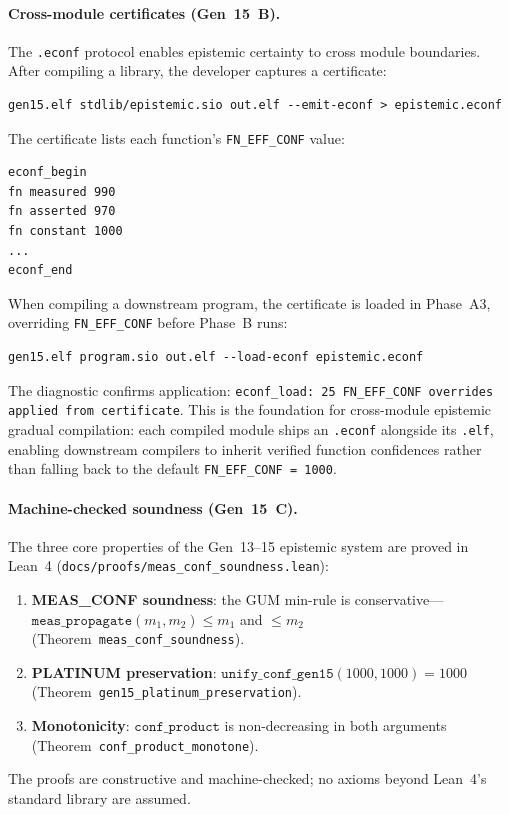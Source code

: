 \documentclass[acmsmall,screen,review,anonymous]{acmart}
\begin{document}
\paragraph{Cross-module certificates (Gen~15~B).}
The \texttt{.econf} protocol enables epistemic certainty to cross module
boundaries.
After compiling a library, the developer captures a certificate:
\begin{verbatim}
gen15.elf stdlib/epistemic.sio out.elf --emit-econf > epistemic.econf
\end{verbatim}
The certificate lists each function's \texttt{FN\_EFF\_CONF} value:
\begin{verbatim}
econf_begin
fn measured 990
fn asserted 970
fn constant 1000
...
econf_end
\end{verbatim}
When compiling a downstream program, the certificate is loaded in
Phase~A3, overriding \texttt{FN\_EFF\_CONF} before Phase~B runs:
\begin{verbatim}
gen15.elf program.sio out.elf --load-econf epistemic.econf
\end{verbatim}
The diagnostic confirms application:
\texttt{econf\_load: 25 FN\_EFF\_CONF overrides applied from certificate}.
This is the foundation for cross-module epistemic gradual compilation:
each compiled module ships an \texttt{.econf} alongside its \texttt{.elf},
enabling downstream compilers to inherit verified function confidences
rather than falling back to the default \texttt{FN\_EFF\_CONF = 1000}.

\paragraph{Machine-checked soundness (Gen~15~C).}
The three core properties of the Gen~13--15 epistemic system are proved
in Lean~4 (\texttt{docs/proofs/meas\_conf\_soundness.lean}):
\begin{enumerate}
  \item \textbf{MEAS\_CONF soundness}: the GUM min-rule is conservative---
        $\texttt{meas\_propagate}(m_1, m_2) \leq m_1$ and $\leq m_2$
        (Theorem~\texttt{meas\_conf\_soundness}).
  \item \textbf{PLATINUM preservation}: $\texttt{unify\_conf\_gen15}(1000, 1000) = 1000$
        (Theorem~\texttt{gen15\_platinum\_preservation}).
  \item \textbf{Monotonicity}: $\texttt{conf\_product}$ is non-decreasing in both
        arguments (Theorem~\texttt{conf\_product\_monotone}).
\end{enumerate}
The proofs are constructive and machine-checked; no axioms beyond Lean~4's
standard library are assumed.
\end{document}
